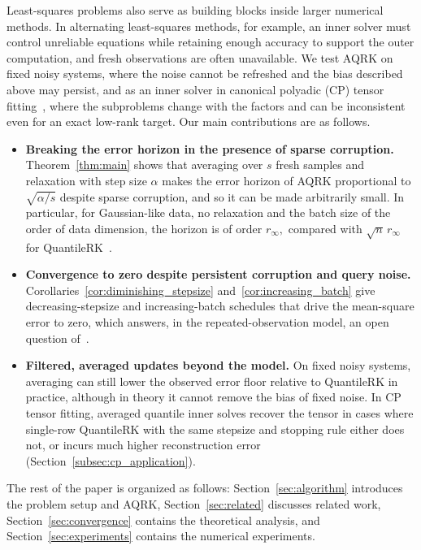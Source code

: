 \documentclass[pdflatex,sn-mathphys-num]{sn-jnl}
\theoremstyle{thmstyleone}
\theoremstyle{thmstylethree}
\begin{document}
Least-squares problems also serve as building blocks inside larger numerical
methods. In alternating least-squares methods, for example, an inner solver
must control unreliable equations while retaining enough accuracy to support
the outer computation, and fresh observations are often unavailable. We test AQRK on fixed noisy systems, where the noise cannot be
refreshed and the bias described above may persist, and as an inner solver in
canonical polyadic (CP) tensor fitting~\cite{kolda2009tensor}, where the
subproblems change with the factors and can be  inconsistent even for an exact
low-rank target. Our main contributions are as follows.
\begin{itemize}
\item \textbf{Breaking the error horizon in the presence of sparse
corruption.} 
Theorem~\ref{thm:main} shows that averaging over $s$ fresh samples and relaxation with step size $\alpha$ makes the error
horizon of AQRK proportional to $\sqrt{\alpha/s}$ despite sparse corruption, and so it can be
made arbitrarily small. In particular, for Gaussian-like data, no relaxation and the batch size of the order of data dimension, the horizon is of order $ r_{\infty},$ compared with $\sqrt n\,r_\infty$ for
QuantileRK~\cite{jarman2021quantilerk}.

\item \textbf{Convergence to zero despite persistent corruption and query
noise.} Corollaries~\ref{cor:diminishing_stepsize}
and~\ref{cor:increasing_batch} give decreasing-stepsize and increasing-batch
schedules that drive the mean-square error to zero, which answers, in the
repeated-observation model, an open question of~\cite{coria2024quantile}.

\item \textbf{Filtered, averaged updates beyond the model.} On fixed noisy
systems, averaging can still lower the observed error floor relative to
QuantileRK in practice, although in theory it cannot remove the bias of fixed noise.
In CP tensor fitting, averaged quantile inner solves recover the tensor in
cases where single-row QuantileRK with the same stepsize and stopping rule either does
not, or incurs much higher reconstruction error (Section~\ref{subsec:cp_application}).
\end{itemize}
The rest of the paper is organized as follows: Section~\ref{sec:algorithm} introduces the problem setup and AQRK,
Section~\ref{sec:related} discusses related work, Section~\ref{sec:convergence}
contains the theoretical analysis, and Section~\ref{sec:experiments} contains the numerical
experiments.
\end{document}
